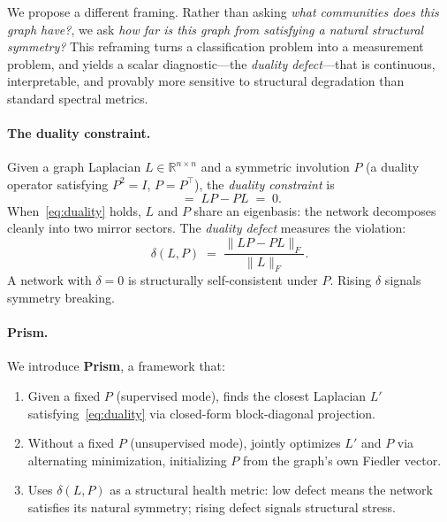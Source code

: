 \documentclass[11pt]{article}
\newcommand{\LP}{L'}
\newcommand{\comm}[2]{[#1,\,#2]}
\newcommand{\Fro}[1]{\|#1\|_F}
\begin{document}
We propose a different framing.
Rather than asking \emph{what communities does this graph have?},
we ask \emph{how far is this graph from satisfying a natural structural
symmetry?}
This reframing turns a classification problem into a measurement problem,
and yields a scalar diagnostic---the \emph{duality defect}---that is
continuous, interpretable, and provably more sensitive to structural
degradation than standard spectral metrics.

\paragraph{The duality constraint.}
Given a graph Laplacian $L \in \mathbb{R}^{n \times n}$ and a symmetric
involution $P$ (a duality operator satisfying $P^2 = I$, $P = P^\top$),
the \emph{duality constraint} is
\begin{equation}
  \comm{L}{P} \;=\; LP - PL \;=\; 0.
  \label{eq:duality}
\end{equation}
When~\eqref{eq:duality} holds, $L$ and $P$ share an eigenbasis: the network
decomposes cleanly into two mirror sectors.
The \emph{duality defect} measures the violation:
\begin{equation}
  \delta(L, P) \;=\; \frac{\Fro{LP - PL}}{\Fro{L}}.
  \label{eq:defect}
\end{equation}
A network with $\delta = 0$ is structurally self-consistent under $P$.
Rising $\delta$ signals symmetry breaking.

\paragraph{Prism.}
We introduce \textbf{Prism}, a framework that:
\begin{enumerate}
  \item Given a fixed $P$ (supervised mode), finds the closest Laplacian
        $\LP$ satisfying~\eqref{eq:duality} via closed-form block-diagonal
        projection.
  \item Without a fixed $P$ (unsupervised mode), jointly optimizes $\LP$
        and $P$ via alternating minimization, initializing $P$ from the
        graph's own Fiedler vector.
  \item Uses $\delta(L, P)$ as a structural health metric: low defect
        means the network satisfies its natural symmetry; rising defect
        signals structural stress.
\end{enumerate}
\end{document}
